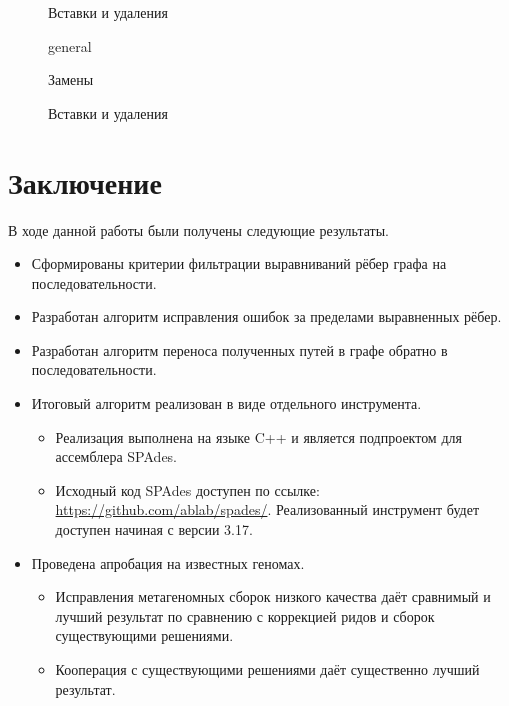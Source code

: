 \documentclass[14pt]{matmex-diploma-custom}
\begin{document}
\begin{figure}[h]
    \centering
    
    \caption{Вставки и удаления}
    \label{fig:indels_bmock12}
\end{figure}

\begin{figure}[h]
    \centering
    
    \caption{general}
    \label{fig:general_zymo}
\end{figure}

\begin{figure}[h]
    \centering
    
    \caption{Замены}
    \label{fig:mismatches_zymo}
\end{figure}

\begin{figure}[h]
    \centering
    
    \caption{Вставки и удаления}
    \label{fig:indels_zymo}
\end{figure}

\newpage
\section*{Заключение}
В ходе данной работы были получены следующие результаты.
\begin{itemize}
    \item Сформированы критерии фильтрации выравниваний рёбер графа на последовательности.
    \item Разработан алгоритм исправления ошибок за пределами выравненных рёбер.
    \item Разработан алгоритм переноса полученных путей в графе обратно в последовательности.
    \item Итоговый алгоритм реализован в виде отдельного инструмента.
    \begin{itemize}
        \item Реализация выполнена на языке C++ и является подпроектом для ассемблера SPAdes.
        \item \begin{sloppypar} Исходный код SPAdes доступен по ссылке: \mbox{\url{https://github.com/ablab/spades/}}. Реализованный инструмент будет доступен начиная с версии 3.17. \end{sloppypar}
    \end{itemize}
    \item Проведена апробация на известных геномах.
    \begin{itemize}
        \item Исправления метагеномных сборок низкого качества даёт сравнимый и лучший результат по сравнению с коррекцией ридов и сборок существующими решениями.
        \item Кооперация с существующими решениями даёт существенно лучший результат.
    \end{itemize}

\end{itemize}
\end{document}
